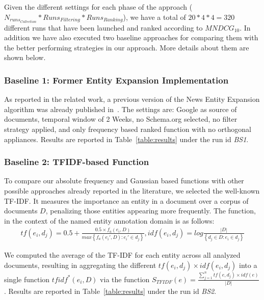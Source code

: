 \documentclass{llncs}
\begin{document}
Given the different settings for each phase of the approach ($N_{runs_{Collection}} * Runs_{Filtering} * Runs_{Ranking}$), we have a total of  $20 * 4 * 4 = 320$ different runs that have been launched and ranked according to $MNDCG_{10}$. In addition we have also executed two baseline approaches for comparing them with the better performing strategies in our approach. More details about them are shown below.

\subsubsection{Baseline 1: Former Entity Expansion Implementation}
As reported in the related work, a previous version of the News Entity Expansion algorithm was already published in~\cite{RedondoGarcia2014}. The settings are: Google as source of documents, temporal window of 2 Weeks, no Schema.org selected, no filter strategy applied, and only frequency based ranked function with no orthogonal appliances. Results are reported in Table~\ref{table:results} under the run id \textit{BS1}.
 
\subsubsection{Baseline 2: TFIDF-based Function}
To compare our absolute frequency and Gaussian based functions with other possible approaches already reported in the literature, we selected the well-known TF-IDF. It measures the importance an entity in a document over a corpus of documents $D$, penalizing those entities appearing more frequently. The function, in the context of the named entity annotation domain is as follows:
\begin{equation}
\begin{matrix}
tf(e_i,d_j) = 0.5 + \frac{0.5\times f_{a}(e_i,D)}{max\left \{ f_{a}(e_i',D) : e_i' \in d_j\right \}},   idf(e_i,d_j) = log\frac{\left | D \right |}{\left \{ d_j\in D  :  e_i\in d_j \right \}}
\end{matrix}
\end{equation}


We computed the average of the TF-IDF for each entity across all analyzed documents, resulting in aggregating the different $tf(e_i,d_j) \times idf(e_i,d_j)$ into a single function $tfidf^{*}(e_i,D)$ via the function $S_{TFIDF}(e)= \frac{ \sum_{j=1}^{n}  tf(e,d_j) \times idf(e)} {|D|}$.  Results are reported in Table~\ref{table:results} under the run id \textit{BS2}.
\end{document}
